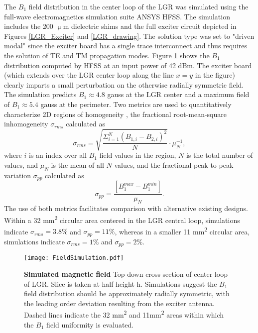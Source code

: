 The $B_1$ field distribution in the center loop of the LGR was simulated using the full-wave electromagnetics simulation suite ANSYS HFSS. The simulation includes the 200 $\upmu$m dielectric shims and the full exciter circuit depicted in Figures \ref{LGR_Exciter} and \ref{LGR_drawing}. The solution type was set to "driven modal" since the exciter board has a single trace interconnect and thus requires the solution of TE and TM propagation modes. Figure \ref{LGR_simulated} shows the $B_1$ distribution computed by HFSS at an input power of 42 dBm. The exciter board (which extends over the LGR center loop along the line $x = y$ in the figure) clearly imparts a small perturbation on the otherwise radially symmetric field. The simulation predicts $B_1 \approx 4.8$ gauss at the LGR center and a maximum field of $B_1 \approx 5.4$ gauss at the perimeter. Two metrics are used to quantitatively characterize 2D regions of homogeneity , the fractional root-mean-square inhomogeneity $\sigma_{rms}$ calculated as 
\begin{equation}\label{sigma_rms}
\sigma_{rms} = \sqrt{\frac{\Sigma_{i = 1}^N(B_{1,i}-B_{2,i})^2}{N}} \cdot \mu_N^{-1},
\end{equation}
where $i$ is an index over all $B_1$ field values in the region, $N$ is the total number of values, and $\mu_N$ is the mean of all $N$ values, and the fractional peak-to-peak variation $\sigma_{pp}$ calculated as
\begin{equation}\label{sigma_pp}
\sigma_{pp} = \frac{\left[B_1^{max} - B_1^{min}\right]}{\mu_N}.
\end{equation} 
The use of both metrics facilitates comparison with alternative existing designs. Within a 32 mm\textsuperscript{2} circular area centered in the LGR central loop, simulations indicate $\sigma_{rms} = 3.8\%$ and $\sigma_{pp} = 11\%$, whereas in a smaller 11 mm\textsuperscript{2} circular area, simulations indicate $\sigma_{rms} = 1\%$ and $\sigma_{pp} = 2\%$.

\begin{figure}[t!]
\centering
\texttt{[image: FieldSimulation.pdf]}  
\caption{\textbf{Simulated magnetic field} Top-down cross section of center loop of LGR. Slice is taken at half height h. Simulations suggest the $B_1$ field distribution
should be approximately radially symmetric, with the leading order deviation resulting from the exciter antenna. Dashed lines indicate the 32 mm\textsuperscript{2} and 11mm\textsuperscript{2} areas within which the $B_1$ field uniformity is evaluated.}
\label{LGR_simulated}
\end{figure}


